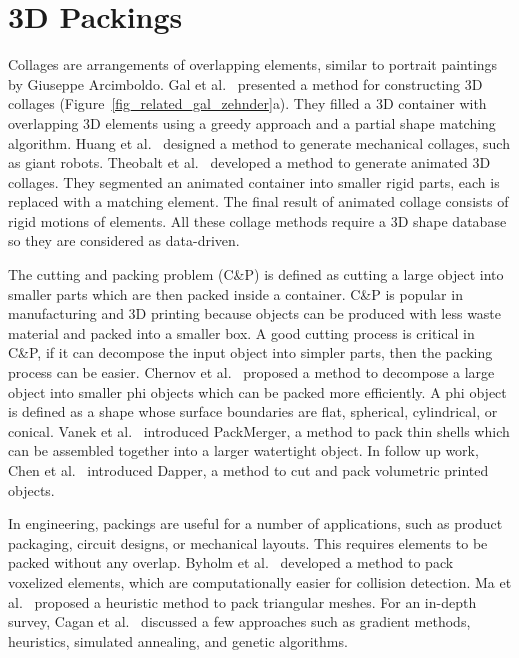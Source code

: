\section{3D Packings}
\newtext
{
Collages are arrangements of overlapping elements, similar to
portrait paintings by Giuseppe Arcimboldo.
Gal et al.~\cite{Gal2007B} presented a method for constructing 3D
collages (Figure~\ref{fig_related_gal_zehnder}a).  
They filled a 3D container with overlapping 3D elements using a greedy
approach and a partial shape matching algorithm.
Huang et al.~\cite{Huang2014} designed a method
to generate mechanical collages, such as giant robots.
Theobalt et al.~\cite{Theobalt2007}
developed a method to generate animated 3D collages.
They segmented an animated container
into smaller rigid parts, each is replaced with a matching element.
The final result of animated collage consists of rigid motions of elements.
All these collage methods require a 3D shape database so they are considered as data-driven. 
}

\newtext
{
The cutting and packing problem (C\&P) is defined as cutting a large object into smaller parts 
which are then packed inside a container.
C\&P is popular in manufacturing and 3D printing because
objects can be produced with less waste material and packed into a smaller box.
A good cutting process is critical in C\&P, if it can decompose the input object
into simpler parts, then the packing process can be easier.
Chernov et al.~\cite{Chernov2010} proposed a method to decompose a large object
into smaller phi objects which can be packed more efficiently.
A phi object is defined as a shape whose surface boundaries 
are flat, spherical, cylindrical, or conical.
Vanek et al.~\cite{Vanek2014} introduced PackMerger,
a method to pack thin shells which can be assembled together into
a larger watertight object.
In follow up work, Chen et al.~\cite{Chen2015} introduced Dapper,
a method to cut and pack volumetric printed objects.
}

\newtext
{
In engineering, packings are useful for a number of applications, 
such as product packaging, circuit designs, or mechanical layouts.
This requires elements to be packed without any overlap.
Byholm et al.~\cite{Byholm2009} developed a method
to pack voxelized elements, which are computationally easier for collision detection.
Ma et al.~\cite{Ma2018} proposed a heuristic method to pack triangular meshes.
For an in-depth survey, Cagan et al.~\cite{Cagan2002} discussed a few approaches such as
gradient methods, heuristics, simulated annealing, and genetic algorithms.
}



